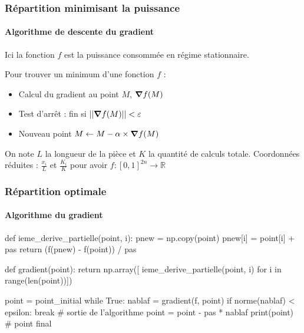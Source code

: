 \documentclass[a4paper,11pt]{beamer}
\begin{document}
\begin{frame}
    \frametitle{Répartition minimisant la puissance}
    \framesubtitle{Algorithme de descente du gradient}

    Ici la fonction $f$ est la puissance consommée en régime stationnaire.
    \vspace{.0em}

    \pause
    Pour trouver un minimum d'une fonction $f$ :
    \begin{itemize}
        \item Calcul du gradient au point $M$, $\grad f (M)$
        \item Test d'arrêt : fin si $||\grad f (M)|| < \varepsilon$
        \item Nouveau point $M \leftarrow M - \alpha \times \grad f (M)$
    \end{itemize}

    \pause
    \vspace{1em}
    On note $L$ la longueur de la pièce et $K$ la quantité de calculs totale.
    Coordonnées réduites : $\frac{x_i}{L}$ et $\frac{K_i}{K}$ pour avoir $f : [0, 1]^{2n} \rightarrow \mathbb{R}$
\end{frame}

\begin{frame}[fragile]
    \frametitle{Répartition optimale}
    \framesubtitle{Algorithme du gradient}

    \begin{python}
def ieme_derive_partielle(point, i):
    pnew = np.copy(point)
    pnew[i] = point[i] + pas
    return (f(pnew) - f(point)) / pas

def gradient(point):
    return np.array([
        ieme_derive_partielle(point, i)
        for i in range(len(point))])

point = point_initial
while True:
    nablaf = gradient(f, point)
    if norme(nablaf) < epsilon:
        break # sortie de l'algorithme
    point = point - pas * nablaf
print(point) # point final
    \end{python}
\end{frame}
\end{document}
